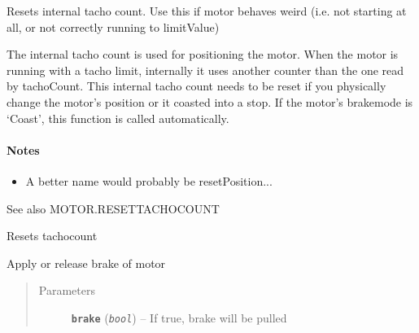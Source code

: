 \documentclass[letterpaper,10pt,english]{sphinxmanual}
\begin{document}
\begin{fulllineitems}
\begin{fulllineitems}
\label{source:source.Motor.internalReset}
Resets internal tacho count. Use this if motor behaves weird (i.e. not starting at all, or not correctly
running to limitValue)

The internal tacho count is used for positioning the motor. When the
motor is running with a tacho limit, internally it uses another counter than the
one read by tachoCount. This internal tacho count needs to be reset if you
physically change the motor's position or it coasted into a stop. If the motor's
brakemode is `Coast', this function is called automatically.
\paragraph{Notes}
\begin{itemize}
\item {} 
A better name would probably be resetPosition...

\end{itemize}

See also MOTOR.RESETTACHOCOUNT

\end{fulllineitems}


\begin{fulllineitems}
\label{source:source.Motor.resetTachoCount}
Resets tachocount

\end{fulllineitems}


\begin{fulllineitems}
\label{source:source.Motor.setBrake}
Apply or release brake of motor
\begin{quote}\begin{description}
\item[{Parameters}] \leavevmode
\textbf{\texttt{brake}} (\emph{\texttt{bool}}) -- If true, brake will be pulled

\end{description}\end{quote}

\end{fulllineitems}


\end{fulllineitems}
\end{document}
